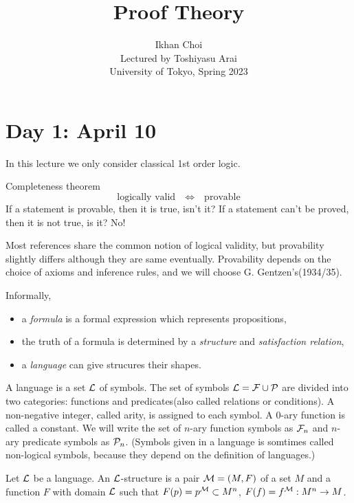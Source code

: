 \documentclass{../../../small}
\begin{document}
\title{Proof Theory}
\author{Ikhan Choi\\Lectured by Toshiyasu Arai\\University of Tokyo, Spring 2023}
\maketitle
\tableofcontents

\newpage
\section{Day 1: April 10}

In this lecture we only consider classical 1st order logic.

Completeness theorem
\[\text{logically valid}\quad\Leftrightarrow\quad\text{provable}\]
If a statement is provable, then it is true, isn't it?
If a statement can't be proved, then it is not true, is it?
No!

Most references share the common notion of logical validity, but provability slightly differs although they are same eventually.
Provability depends on the choice of axioms and inference rules, and we will choose G. Gentzen's(1934/35).

Informally,
\begin{itemize}
\item a \emph{formula} is a formal expression which represents propositions,
\item the truth of a formula is determined by a \emph{structure} and \emph{satisfaction relation},
\item a \emph{language} can give strucures their shapes.
\end{itemize}
\begin{defn}
A language is a set $\mathcal{L}$ of symbols.
The set of symbols $\mathcal{L}=\mathcal{F}\cup\mathcal{P}$ are divided into two categories: functions and predicates(also called relations or conditions).
A non-negative integer, called arity, is assigned to each symbol.
A 0-ary function is called a constant.
We will write the set of $n$-ary function symbols as $\mathcal{F}_n$ and $n$-ary predicate symbols as $\mathcal{P}_n$.
(Symbols given in a language is somtimes called non-logical symbols, because they depend on the definition of languages.)
\end{defn}

\begin{defn}
Let $\mathcal{L}$ be a language.
An $\mathcal{L}$-structure is a pair $\mathcal{M}=(M,F)$ of a set $M$ and a function $F$ with domain $\mathcal{L}$ such that $F(p)=p^{\mathcal{M}}\subset M^n$, $F(f)=f^{\mathcal{M}}:M^n\to M$.
\end{defn}
\end{document}
